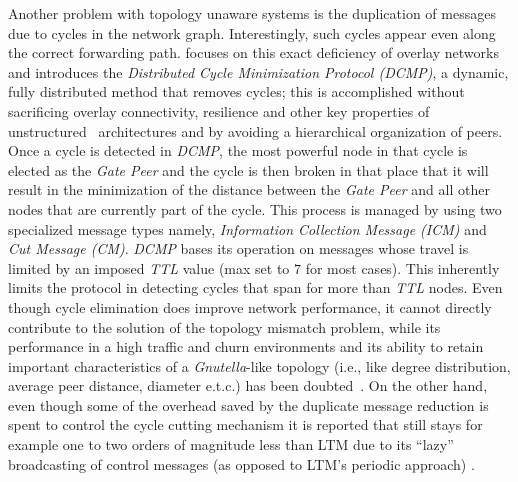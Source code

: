 Another problem with topology unaware
systems is the duplication of messages due to cycles in the network graph.
Interestingly, such cycles appear even along the correct forwarding path.
\cite{ZKB2008} focuses on this exact deficiency of overlay networks and
introduces the \emph{Distributed Cycle Minimization Protocol
(DCMP)}, a dynamic, fully distributed method that removes cycles;
this is accomplished without sacrificing
overlay connectivity, resilience and other key properties of unstructured
\p\ architectures and by avoiding a hierarchical organization of peers. 
Once a cycle is detected in {\it DCMP}, the most powerful node in that cycle 
is elected as the \emph{Gate Peer} and the cycle is then broken in that place
that it will result in the minimization of the distance between the
\emph{Gate Peer} and all other nodes that are currently part of the cycle. 
This process is managed by using two specialized message types 
namely, \emph{Information Collection Message (ICM)} and \emph{Cut Message (CM)}. 
\emph{DCMP} bases its operation on messages whose travel is limited by an
imposed \emph{TTL} value (max set to $7$ for most cases). This inherently limits
the protocol in detecting cycles that span for more than \emph{TTL} nodes.
Even though cycle elimination does improve network performance, 
it cannot  directly contribute to the solution of the topology mismatch
problem, while its performance in a high traffic and churn environments and its
ability to retain important characteristics of a {\sl Gnutella}-like topology (i.e.,
like degree distribution, average peer distance, diameter e.t.c.) has been
doubted~\cite{CSG2010}. 
On the other hand, even though some of the overhead
saved by the duplicate message reduction is spent to control the cycle cutting
mechanism it is reported that still stays for example one to two orders of
magnitude less than LTM due to its ``lazy'' broadcasting of control messages
(as opposed to LTM's periodic approach) \cite{ZKB2008}.
%
%
